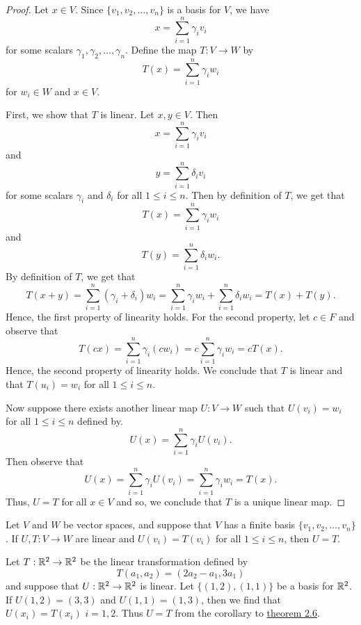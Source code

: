 \begin{proof}
Let \( x \in V  \). Since \( \{ v_{1}, v_{2}, \dots, v_{n} \}  \) is a basis for \( V  \), we have
\[  x = \sum_{ i=1 }^{ n } \gamma_{i} v_{i}  \] for some scalars \( \gamma_{1}, \gamma_{2}, \dots, \gamma_{n}  \). Define the map \( T: V \to W  \) by
\[  T(x) = \sum_{ i=1 }^{ n } \gamma_{i} w_{i}  \]
for \( w_{i} \in W  \) and \( x \in V  \). 

First, we show that \( T  \) is linear. Let \( x,y \in V  \). Then 
\[ x =  \sum_{ i=1 }^{ n } \gamma_{i} v_{i}  \] and 
\[ y =  \sum_{ i=1 }^{ n } \delta_{i} v_{i}  \] for some scalars \( \gamma_{i}  \) and \( \delta_{i}  \) for all \( 1 \leq i \leq n \). Then by definition of \( T  \), we get that 
\[  T(x) = \sum_{ i=1 }^{ n } \gamma_{i} w_{i}  \] and 
\[ T(y) = \sum_{ i=1 }^{ n } \delta_{i} w_{i}. \]
By definition of \( T  \), we get that  
\[  T(x+y) = \sum_{ i=1 }^{ n } (\gamma_{i} + \delta_{i}) w_{i} = \sum_{ i=1 }^{ n } \gamma_{i} w_{i} + \sum_{ i=1 }^{ n } \delta_{i} w_{i} = T(x) + T(y).  \]
Hence, the first property of linearity holds. For the second property, let \( c \in F  \) and observe that
\[  T(cx) = \sum_{ i=1 }^{ n } \gamma_{i} (cw_{i}) = c \sum_{ i=1 }^{ n } \gamma_{i} w_{i} = c T(x). \]
Hence, the second property of linearity holds. We conclude that \( T  \) is linear and that \( T(u_{i}) = w_{i}  \) for all \( 1 \leq i \leq n \).

Now suppose there exists another linear map \( U: V \to W  \) such that \( U(v_{i}) = w_{i}  \) for all \( 1 \leq i \leq n \) defined by.
\[ U(x) = \sum_{i =1  }^{ n } \gamma_{i} U(v_{i}).  \]
Then observe that
\[ U(x) = \sum_{ i=1 }^{ n } \gamma_{i} U(v_{i}) = \sum_{ i=1 }^{ n } \gamma_{i} w_{i} = T(x). \]
Thus, \( U = T  \) for all \( x \in V  \) and so, we conclude that \( T  \) is a unique linear map.
\end{proof}

\begin{corollary}
  Let \( V  \) and \( W  \) be vector spaces, and suppose that \( V  \) has a finite basis \( \{ v_{1}, v_{2}, \dots, v_{n} \}  \). If \( U,T : V \to W  \) are linear and \( U(v_{i}) = T(v_{i}) \) for all \( 1 \leq i \leq n \), then \( U = T  \).  
\end{corollary}

\begin{eg}
    Let \( T : \mathbb{R}^{2} \to \mathbb{R}^{2}  \) be the linear transformation defined by 
    \[  T(a_{1}, a_{2}) = (2a_{2} - a_{1}, 3a_{1}) \]
    and suppose that \( U: \mathbb{R}^{2} \to \mathbb{R}^{2}  \) is linear. Let \( \{ (1,2), (1,1) \}  \) be a basis for \( \mathbb{R}^{2} \). If \( U(1,2) = (3,3)  \) and \( U(1,1) = (1,3)  \), then we find that \( U(x_{i}) = T(x_{i}) \) \( i = 1,2 \). Thus \( U = T  \) from the corollary to {\hyperref[Theorem 2.6]{theorem 2.6}}. 
\end{eg}

